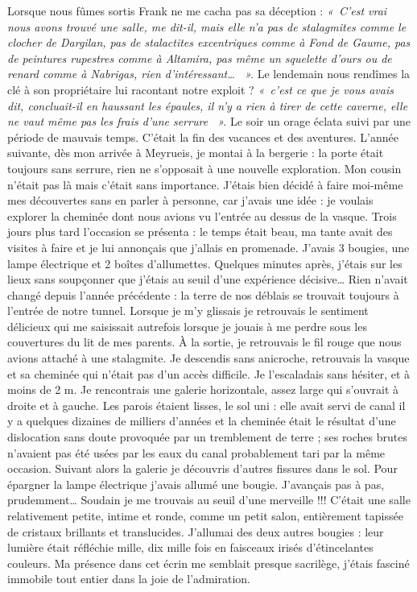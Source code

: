 Lorsque nous fûmes sortis Frank ne me cacha pas sa déception : \textit{«~C’est vrai nous avons
trouvé une salle, me dit-il, mais elle n’a pas de stalagmites comme le clocher de Dargilan,
pas de stalactites excentriques comme à Fond de Gaume, pas de peintures rupestres comme à
Altamira, pas même un squelette d’ours ou de renard comme à Nabrigas, rien
d’intéressant… ~».}
Le lendemain nous rendîmes la clé à son propriétaire lui racontant notre exploit ? \textit{«~c’est ce
que je vous avais dit, concluait-il en haussant les épaules, il n’y a rien à tirer de cette
caverne, elle ne vaut même pas les frais d’une serrure ~».}
Le soir un orage éclata suivi par une période de mauvais temps. C’était la fin des vacances et
des aventures.
L’année suivante, dès mon arrivée à Meyrueis, je montai à la bergerie : la porte était toujours
sans serrure, rien ne s’opposait à une nouvelle exploration. Mon cousin n’était pas là mais
c’était sans importance. J’étais bien décidé à faire moi-même mes découvertes sans en parler à
personne, car j’avais une idée : je voulais explorer la cheminée dont nous avions vu l’entrée
au dessus de la vasque. Trois jours plus tard l’occasion se présenta : le temps était beau, ma
tante avait des visites à faire et je lui annonçais que j’allais en promenade. J’avais 3 bougies,
une lampe électrique et 2 boîtes d’allumettes. Quelques minutes après, j’étais sur les lieux
sans soupçonner que j’étais au seuil d’une expérience décisive…
Rien n’avait changé depuis l’année précédente : la terre de nos déblais se trouvait toujours à
l’entrée de notre tunnel. Lorsque je m’y glissais je retrouvais le sentiment délicieux qui me
saisissait autrefois lorsque je jouais à me perdre sous les couvertures du lit de mes parents. À
la sortie, je retrouvais le fil rouge que nous avions attaché à une stalagmite. Je descendis sans
anicroche, retrouvais la vasque et sa cheminée qui n’était pas d’un accès difficile. Je
l’escaladais sans hésiter, et à moins de 2 m. Je rencontrais une galerie horizontale, assez large
qui s’ouvrait à droite et à gauche. Les parois étaient lisses, le sol uni : elle avait servi de canal
il y a quelques dizaines de milliers d’années et la cheminée était le résultat d’une dislocation
sans doute provoquée par un tremblement de terre ; ses roches brutes n’avaient pas été usées
par les eaux du canal probablement tari par la même occasion. Suivant alors la galerie je
découvris d’autres fissures dans le sol. Pour épargner la lampe électrique j’avais allumé une
bougie. J’avançais pas à pas, prudemment… Soudain je me trouvais au seuil d’une
merveille !!! C’était une salle relativement petite, intime et ronde, comme un petit salon,
entièrement tapissée de cristaux brillants et translucides. J’allumai des deux autres bougies :
leur lumière était réfléchie mille, dix mille fois en faisceaux irisés d’étincelantes couleurs. Ma
présence dans cet écrin me semblait presque sacrilège, j’étais fasciné immobile tout entier
dans la joie de l’admiration.

